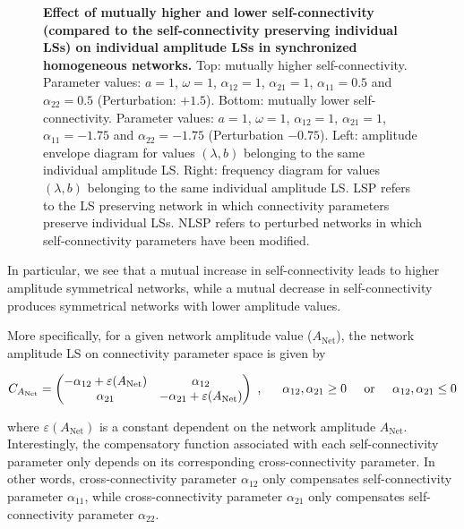 \begin{figure}[h]
    \caption{\textbf{Effect of mutually higher and lower self-connectivity (compared to the self-connectivity preserving individual LSs) on individual amplitude LSs in synchronized homogeneous networks.} Top: mutually higher self-connectivity. Parameter values: $a = 1$, $\omega = 1$, $\alpha_{12}=1$, $\alpha_{21}=1$, $\alpha_{11}=0.5$ and $\alpha_{22}=0.5$ (Perturbation: $+1.5$). Bottom: mutually lower self-connectivity. Parameter values: $a = 1$, $\omega = 1$, $\alpha_{12}=1$, $\alpha_{21}=1$, $\alpha_{11}=-1.75$ and $\alpha_{22}=-1.75$ (Perturbation $-0.75$). Left: amplitude  envelope  diagram  for values  $(\lambda,b)$  belonging  to the  same individual  amplitude  LS. Right: frequency  diagram  for  values  $(\lambda,b)$ belonging  to  the  same  individual  amplitude LS. LSP refers to the LS preserving network in which connectivity parameters preserve individual LSs. NLSP refers to perturbed networks in which self-connectivity parameters have been modified.}
  \label{photo18}
\end{figure}

In particular, we see that a mutual increase in self-connectivity leads to higher amplitude symmetrical networks, while a mutual decrease in self-connectivity produces symmetrical networks with lower amplitude values.

More specifically, for a given network amplitude value ($A_{\text{Net}}$), the network amplitude LS on connectivity parameter space is given by

\begin{equation}
    C_{A_{\text{Net}}} = 
    \begin{pmatrix}
        -\alpha_{12} + \varepsilon(A_{\text{Net}}) & \alpha_{12}\\
        \alpha_{21} & -\alpha_{21} + \varepsilon(A_{\text{Net}})
    \end{pmatrix}
    \text{ , } \hspace{0.5cm} \alpha_{12},\alpha_{21} \geq 0 \hspace{0.5cm} \text{or} \hspace{0.5cm}  \alpha_{12},\alpha_{21} \leq 0 
    \label{e37}
\end{equation}

where $\varepsilon(A_{\text{Net}})$ is a constant dependent on the network amplitude $A_{\text{Net}}$. Interestingly, the compensatory function associated with each self-connectivity parameter only depends on its corresponding cross-connectivity parameter. In other words, cross-connectivity parameter $\alpha_{12}$ only compensates self-connectivity parameter $\alpha_{11}$, while cross-connectivity parameter $\alpha_{21}$ only compensates self-connectivity parameter $\alpha_{22}$.

